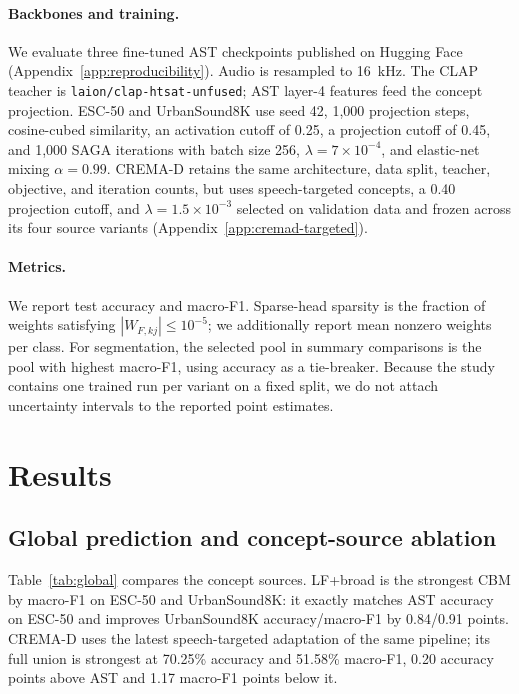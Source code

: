 \documentclass[10pt]{article}
\begin{document}
\paragraph{Backbones and training.}
We evaluate three fine-tuned AST checkpoints published on Hugging Face (Appendix~\ref{app:reproducibility}). Audio is resampled to 16~kHz. The CLAP teacher is \texttt{laion/clap-htsat-unfused}; AST layer-4 features feed the concept projection. ESC-50 and UrbanSound8K use seed 42, 1,000 projection steps, cosine-cubed similarity, an activation cutoff of 0.25, a projection cutoff of 0.45, and 1,000 SAGA iterations with batch size 256, $\lambda=7\times10^{-4}$, and elastic-net mixing $\alpha=0.99$. CREMA-D retains the same architecture, data split, teacher, objective, and iteration counts, but uses speech-targeted concepts, a 0.40 projection cutoff, and $\lambda=1.5\times10^{-3}$ selected on validation data and frozen across its four source variants (Appendix~\ref{app:cremad-targeted}).

\paragraph{Metrics.}
We report test accuracy and macro-F1. Sparse-head sparsity is the fraction of weights satisfying $|W_{F,kj}|\leq10^{-5}$; we additionally report mean nonzero weights per class. For segmentation, the selected pool in summary comparisons is the pool with highest macro-F1, using accuracy as a tie-breaker. Because the study contains one trained run per variant on a fixed split, we do not attach uncertainty intervals to the reported point estimates.

\section{Results}
\label{sec:results}

\subsection{Global prediction and concept-source ablation}
Table~\ref{tab:global} compares the concept sources. LF+broad is the strongest CBM by macro-F1 on ESC-50 and UrbanSound8K: it exactly matches AST accuracy on ESC-50 and improves UrbanSound8K accuracy/macro-F1 by 0.84/0.91 points. CREMA-D uses the latest speech-targeted adaptation of the same pipeline; its full union is strongest at 70.25\% accuracy and 51.58\% macro-F1, 0.20 accuracy points above AST and 1.17 macro-F1 points below it.
\end{document}
